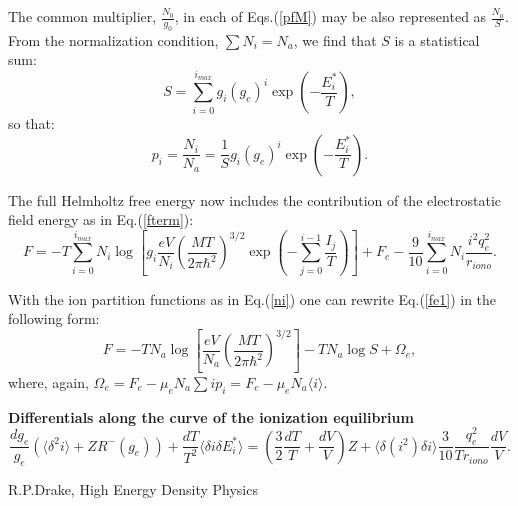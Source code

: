 \documentclass[english,12pt]{revtex4}
\begin{document}
The common multiplier, $\frac{N_0}{g_0}$, in each of Eqs.(\ref{pfM}) may be also represented as $\frac{N_a}{S}$.
From the normalization condition, $\sum N_i = N_a$, we find that $S$ is a statistical sum:
\begin{equation}
S=\sum_{i=0}^{i_{max}} g_i (g_e)^i \exp\left(-\frac{E_i^*}T\right),
\end{equation}
so that:
\begin{equation}\label{ni}
p_i = \frac{N_i}{N_a} = \frac{1}S g_i (g_e)^i \exp \left( -\frac{E_i^*}T \right).
\end{equation}

The full Helmholtz free energy now includes the contribution of the electrostatic field energy as in Eq.(\ref{fterm}):
\begin{equation}\label{fe1}
F=-T
\sum_{i=0}^{i_{max}}{
N_i\log\left[g_i
  \frac{eV}{N_i}\left(\frac{MT}{2\pi \hbar^2}\right)^{3/2}\exp \left(-\sum_{j=0}^{i-1}\frac{I_j}T \right)\right]}+F_e
  -\frac{9}{10} \sum_{i=0}^{i_{max}} N_i \frac{i^2 q_e^2}{r_{iono}}.
\end{equation}  

With the ion partition functions as in Eq.(\ref{ni}) one can rewrite Eq.(\ref{fe1}) in the following form:
\begin{equation}\label{ffullm}
F = -TN_a\log\left[\frac{eV}{N_a}\left(\frac{MT}{2\pi \hbar^2}\right)^{3/2}\right]-TN_a\log S + \Omega_e, 
\end{equation}
where, again, $\Omega_e = F_e - \mu_e N_a \sum i p_i = F_e - \mu_e N_a \langle i \rangle $.

{\bf Differentials along the curve of the ionization equilibrium}
\begin{equation}
\frac{dg_e}{g_e} (\langle \delta^2 i \rangle + ZR^-(g_e)) + \frac{dT}{T^2} \langle \delta i \delta E_i^* \rangle =
\left(\frac32 \frac{dT}T + \frac{dV}V\right) Z + \langle \delta(i^2) \delta i \rangle \frac{3}{10} \frac{q_e^2}{Tr_{iono}}
\frac{dV}{V}.
\end{equation}



\begin{thebibliography}{99}
R.P.Drake, High Energy Density Physics
\end{thebibliography}
\end{document}
